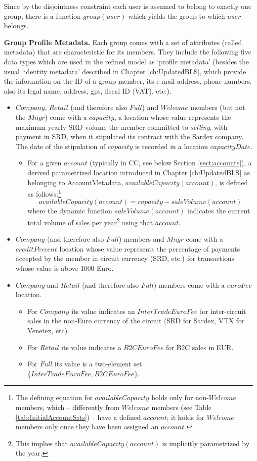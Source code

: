 Since by the disjointness constraint each user is assumed to belong to exactly one group, there is a function $group(user)$ which yields the group to which $user$ belongs.

{\bf Group Profile Metadata.} Each group comes with a set of attributes (called metadata) that are characteristic for its members. They include the following five data types which are used in the refined model as `profile metadata' (besides the usual `identity metadata' described in Chapter \ref{ch:UpdatedBLS}, which provide the information on the ID of a group member, its e-mail address, phone numbers, also its legal name, address, gps, fiscal ID (VAT), etc.).
\begin{itemize}
	\item $Company$, $Retail$ (and therefore also $Full$) and $Welcome$ members (but not the $Mngr$) come with a $capacity$, a location whose value represents the maximum yearly SRD volume the member committed to \emph{selling}, with payment in SRD, when it stipulated its contract with the Sardex company. The date of the stipulation of $capacity$ is recorded in a location $capacityDate$.
	\begin{itemize}
		\item For a given $account$ (typically in CC, see below Section \ref{sect:accounts}), a derived parametrized location introduced in Chapter \ref{ch:UpdatedBLS} as belonging to AccountMetadata, $availableCapacity(account)$, is defined as follows:\footnote{The defining equation for $availableCapacity$ holds only for non-$Welcome$ members, which -- differently from $Welcome$ members (see Table \ref{tab:InitialAccountSets}) -- have a defined $account$; it holds for $Welcome$ members only once they have been assigned an $account$.} 
		\[availableCapacity(account)=capacity-saleVolume(account)\]
		where the dynamic function $saleVolume(account)$ indicates the current total volume of \underline{sales} per year\footnote{This implies that $availableCapacity(account)$ is implicitly parametrized by the year.} using that $account$.
	\end{itemize}

\item $Company$ (and therefore also $Full$) members and $Mngr$ come with a $creditPercent$ location whose value represents the percentage of payments accepted by the member in circuit currency (SRD, etc.) for transactions whose value is above 1000 Euro.

\item $Company$ and $Retail$ (and therefore also $Full$) members come with a $euroFee$ location. 
	\begin{itemize}
	\item For $Company$ its value indicates an $InterTradeEuroFee$ for inter-circuit sales in the non-Euro currency of the circuit (SRD for Sardex, VTX for Venetex, etc).
	\item For $Retail$ its value indicates a $B2CEuroFee$ for B2C sales in EUR.
	\item For $Full$ its value is a two-element set $\{InterTradeEuroFee,B2CEuroFee\}$. 
	\end{itemize}


\end{itemize}
